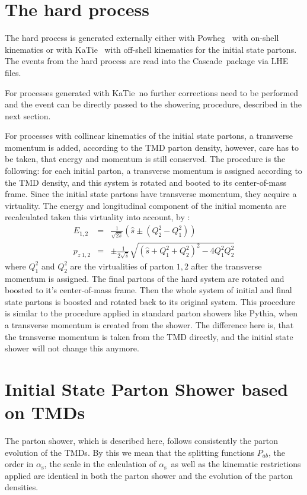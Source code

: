 \documentclass[11pt]{article} \usepackage{mystyle-new}
\newcommand{\as}{\ensuremath{\alpha_\mathrm{s}}}
\def\shat{\ensuremath{\hat{s}}}
\def\cascade{{\sc Cascade}}
\def\katie{{\sc KaTie}}
\def\powheg{{\sc Powheg}}
\def\pythia{{\sc Pythia}}
\begin{document}
\section{The hard process}
\label{sec:LHEfiles}

The hard process is generated externally either with \powheg ~ with on-shell kinematics or with \katie ~\cite{vanHameren:2016kkz} with off-shell kinematics for the initial state partons. The events from the hard process are read into the \cascade\ package via LHE files.

For processes generated with \katie\ no further corrections need to be performed and the event can be directly
passed to the showering procedure, described in the next section.

For processes with collinear kinematics of the initial state partons, a transverse momentum is added, according to the 
TMD parton density, however, care has to be taken, that energy and momentum is still conserved. The procedure is the following:
for each initial parton, a transverse momentum is assigned according to the TMD density, and this system is rotated and booted to its center-of-mass frame. Since the initial state partons have transverse momentum, they acquire a virtuality. The energy and longitudinal component of the initial momenta are recalculated taken this virtuality into account, by \cite{Bengtsson:1986gz}:
\begin{eqnarray}
E_{1,2} &=& \frac{1}{\sqrt{2\shat}} \left( \shat \pm (Q_2^2 - Q_1^2) \right)\\
p_{z\;1,2} & = &  \pm \frac{1}{2\sqrt{\shat}}\sqrt{(\shat + Q_1^2 +Q_2^2)^2 - 4Q_1^2Q_2^2 }
\end{eqnarray}
where $Q_1^2$ and $Q_2^2$ are the virtualities of parton $1,2$ after the transverse momentum is assigned.
The final partons of the hard system are rotated and boosted to it's center-of-mass frame. 
Then the whole system of initial and final state partons is boosted and rotated back to its original system. This procedure is similar to the procedure applied in standard parton showers like \pythia , when a transverse momentum is created from the shower. The difference here is, that the transverse momentum is taken from the TMD directly, and the initial state shower will not change this anymore.

 \section{Initial State Parton Shower based on TMDs}
\label{TMDshower}
The parton shower, which is described here, follows consistently the parton evolution of the TMDs. 
By this we mean that the splitting functions $P_{ab}$, the order in \as , the scale in the calculation of \as\, as well as the kinematic restrictions applied are identical in both the parton shower and the evolution of the parton densities.
\end{document}
